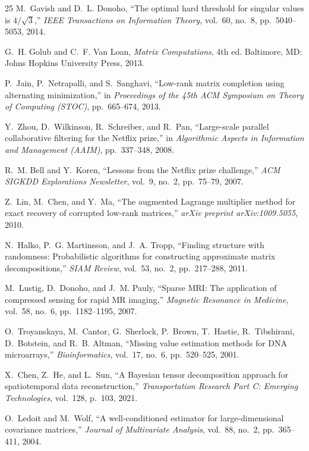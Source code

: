 \documentclass[conference]{IEEEtran}
\begin{document}
\begin{thebibliography}{25}
M.~Gavish and D.~L. Donoho,
``The optimal hard threshold for singular values is $4/\sqrt{3}$,''
\emph{IEEE Transactions on Information Theory},
vol.~60, no.~8, pp.~5040--5053, 2014.

G.~H. Golub and C.~F. Van Loan,
\emph{Matrix Computations}, 4th ed.
Baltimore, MD: Johns Hopkins University Press, 2013.

P.~Jain, P.~Netrapalli, and S.~Sanghavi,
``Low-rank matrix completion using alternating minimization,''
in \emph{Proceedings of the 45th ACM Symposium on Theory of Computing (STOC)},
pp.~665--674, 2013.

Y.~Zhou, D.~Wilkinson, R.~Schreiber, and R.~Pan,
``Large-scale parallel collaborative filtering for the Netflix prize,''
in \emph{Algorithmic Aspects in Information and Management (AAIM)},
pp.~337--348, 2008.

R.~M. Bell and Y.~Koren,
``Lessons from the Netflix prize challenge,''
\emph{ACM SIGKDD Explorations Newsletter},
vol.~9, no.~2, pp.~75--79, 2007.

Z.~Lin, M.~Chen, and Y.~Ma,
``The augmented Lagrange multiplier method for exact recovery of corrupted low-rank matrices,''
\emph{arXiv preprint arXiv:1009.5055}, 2010.

N.~Halko, P.~G. Martinsson, and J.~A. Tropp,
``Finding structure with randomness: Probabilistic algorithms for constructing approximate matrix decompositions,''
\emph{SIAM Review},
vol.~53, no.~2, pp.~217--288, 2011.

M.~Lustig, D.~Donoho, and J.~M. Pauly,
``Sparse MRI: The application of compressed sensing for rapid MR imaging,''
\emph{Magnetic Resonance in Medicine},
vol.~58, no.~6, pp.~1182--1195, 2007.

O.~Troyanskaya, M.~Cantor, G.~Sherlock, P.~Brown, T.~Hastie, R.~Tibshirani, D.~Botstein, and R.~B. Altman,
``Missing value estimation methods for DNA microarrays,''
\emph{Bioinformatics},
vol.~17, no.~6, pp.~520--525, 2001.

X.~Chen, Z.~He, and L.~Sun,
``A Bayesian tensor decomposition approach for spatiotemporal data reconstruction,''
\emph{Transportation Research Part C: Emerging Technologies},
vol.~128, p.~103, 2021.

O.~Ledoit and M.~Wolf,
``A well-conditioned estimator for large-dimensional covariance matrices,''
\emph{Journal of Multivariate Analysis},
vol.~88, no.~2, pp.~365--411, 2004.


\end{thebibliography}
\end{document}
